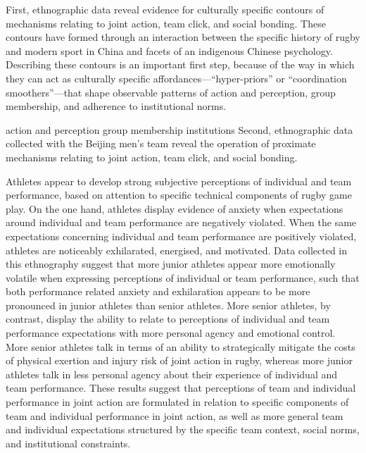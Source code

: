   First, ethnographic data reveal evidence for culturally specific contours of mechanisms relating to joint action, team click, and social bonding.  These contours have formed through an interaction between the specific history of rugby and modern sport in China and facets of an indigenous Chinese psychology.  Describing these contours is an important first step, because of the way in which they can act as culturally specific affordances---``hyper-priors'' or ``coordination smoothers''---that shape observable patterns of action and perception, group membership, and adherence to institutional norms.

  action and perception
  group membership
  institutions  Second, ethnographic data collected with the Beijing men's team reveal the operation of proximate mechanisms relating to joint action, team click, and social bonding.

  Athletes appear to develop strong subjective perceptions of individual and team performance, based on attention to specific technical components of rugby game play.   On the one hand, athletes display evidence of anxiety when expectations around individual and team performance are negatively violated.  When the same expectations concerning individual and team performance are positively violated, athletes are noticeably exhilarated, energised, and motivated.  Data collected in this ethnography suggest that more junior athletes appear more emotionally volatile when expressing perceptions of individual or team performance, such that both performance related anxiety and exhilaration appears to be more pronounced in junior athletes than senior athletes.  More senior athletes, by contrast, display the ability to relate to perceptions of individual and team performance expectations with more personal agency and emotional control.  More senior athletes talk in terms of an ability to strategically mitigate the costs of physical exertion and injury risk of joint action in rugby, whereas more junior athletes talk in less personal agency about their experience of individual and team performance.  These results suggest that perceptions of team and individual performance in joint action are formulated in relation to specific components of team and individual performance in joint action, as well as more general team and individual expectations structured by the specific team context, social norms, and institutional constraints.

